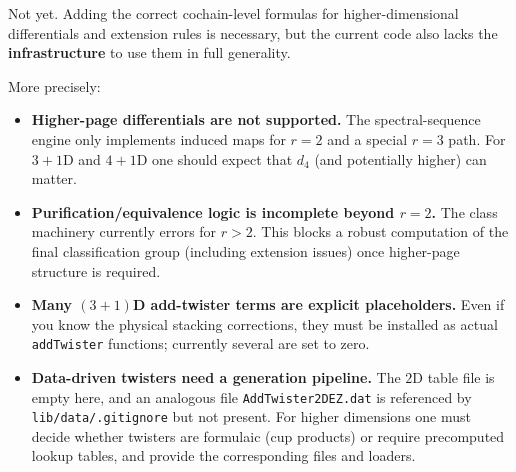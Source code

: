 \documentclass{SciPost}
\begin{document}
Not yet.
Adding the correct cochain-level formulas for higher-dimensional differentials and extension rules is necessary, but the current code also lacks the \textbf{infrastructure} to use them in full generality.

More precisely:
\begin{itemize}
    \item \textbf{Higher-page differentials are not supported.} The spectral-sequence engine only implements induced maps for $r=2$ and a special $r=3$ path. For $3{+}1$D and $4{+}1$D one should expect that $d_4$ (and potentially higher) can matter.
    \item \textbf{Purification/equivalence logic is incomplete beyond $r=2$.} The class machinery currently errors for $r>2$. This blocks a robust computation of the final classification group (including extension issues) once higher-page structure is required.
    \item \textbf{Many $(3{+}1)$D add-twister terms are explicit placeholders.} Even if you know the physical stacking corrections, they must be installed as actual \texttt{addTwister} functions; currently several are set to zero.
    \item \textbf{Data-driven twisters need a generation pipeline.} The $2$D table file is empty here, and an analogous file \texttt{AddTwister2DEZ.dat} is referenced by \texttt{lib/data/.gitignore} but not present. For higher dimensions one must decide whether twisters are formulaic (cup products) or require precomputed lookup tables, and provide the corresponding files and loaders.
\end{itemize}
\end{document}
